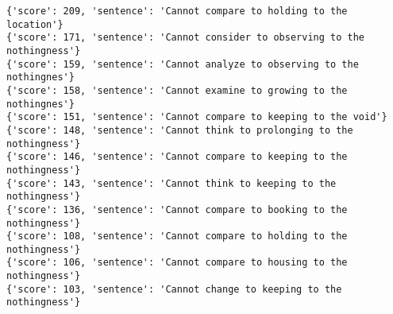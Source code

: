 \documentclass[12pt,a4paper,oneside]{book}
\begin{document}
\begin{verbatim}
{'score': 209, 'sentence': 'Cannot compare to holding to the location'}
{'score': 171, 'sentence': 'Cannot consider to observing to the nothingness'}
{'score': 159, 'sentence': 'Cannot analyze to observing to the nothingnes'}
{'score': 158, 'sentence': 'Cannot examine to growing to the nothingnes'}
{'score': 151, 'sentence': 'Cannot compare to keeping to the void'}
{'score': 148, 'sentence': 'Cannot think to prolonging to the nothingness'}
{'score': 146, 'sentence': 'Cannot compare to keeping to the nothingness'}
{'score': 143, 'sentence': 'Cannot think to keeping to the nothingness'}
{'score': 136, 'sentence': 'Cannot compare to booking to the nothingness'}
{'score': 108, 'sentence': 'Cannot compare to holding to the nothingness'}
{'score': 106, 'sentence': 'Cannot compare to housing to the nothingness'}
{'score': 103, 'sentence': 'Cannot change to keeping to the nothingness'}


\end{verbatim}
\end{document}
